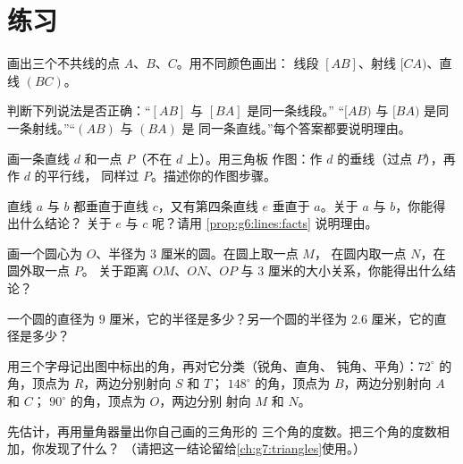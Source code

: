 \section{练习}

\begin{exercise}[$\star$]\label{exo:g6:lines:1}
画出三个不共线的点 $A$、$B$、$C$。用不同颜色画出：
线段 $[AB]$、射线 $[CA)$、直线 $(BC)$。
\end{exercise}

\begin{exercise}[$\star$]\label{exo:g6:lines:2}
判断下列说法是否正确：“$[AB]$ 与 $[BA]$ 是同一条线段。”
“$[AB)$ 与 $[BA)$ 是同一条射线。”“$(AB)$ 与 $(BA)$ 是
同一条直线。”每个答案都要说明理由。
\end{exercise}

\begin{exercise}[$\star$]\label{exo:g6:lines:3}
画一条直线 $d$ 和一点 $P$（不在 $d$ 上）。用三角板
作图：作 $d$ 的垂线（过点 $P$），再作 $d$ 的平行线，
同样过 $P$。描述你的作图步骤。
\end{exercise}

\begin{exercise}[$\star$]\label{exo:g6:lines:4}
直线 $a$ 与 $b$ 都垂直于直线 $c$，又有第四条直线
$e$ 垂直于 $a$。关于 $a$ 与 $b$，你能得出什么结论？
关于 $e$ 与 $c$ 呢？请用 \cref{prop:g6:lines:facts} 说明理由。
\end{exercise}

\begin{exercise}[$\star$]\label{exo:g6:lines:5}
画一个圆心为 $O$、半径为 $3$ 厘米的圆。在圆上取一点 $M$，
在圆内取一点 $N$，在圆外取一点 $P$。
关于距离 $OM$、$ON$、$OP$ 与 $3$ 厘米的大小关系，你能得出什么结论？
\end{exercise}

\begin{exercise}[$\star$]\label{exo:g6:lines:6}
一个圆的直径为 $9$ 厘米，它的半径是多少？另一个圆的半径为
$2.6$ 厘米，它的直径是多少？
\end{exercise}

\begin{exercise}[$\star$]\label{exo:g6:lines:7}
用三个字母记出图中标出的角，再对它分类（锐角、直角、
钝角、平角）：$72^\circ$ 的角，顶点为 $R$，两边分别射向 $S$ 和 $T$；
$148^\circ$ 的角，顶点为 $B$，两边分别射向 $A$ 和 $C$；
$90^\circ$ 的角，顶点为 $O$，两边分别
射向 $M$ 和 $N$。
\end{exercise}

\begin{exercise}[$\star$]\label{exo:g6:lines:8}
先估计，再用量角器量出你自己画的三角形的
三个角的度数。把三个角的度数相加，你发现了什么？
（请把这一结论留给\cref{ch:g7:triangles}使用。）
\end{exercise}

